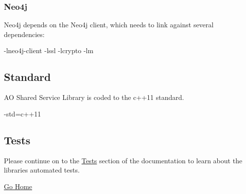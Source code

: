 \subsubsection*{Neo4j}

Neo4j depends on the Neo4j client, which needs to link against several dependencies\+: \begin{DoxyVerb}-lneo4j-client -lssl -lcrypto -lm
\end{DoxyVerb}


\subsection*{Standard}

AO Shared Service Library is coded to the c++11 standard. \begin{DoxyVerb}-std=c++11
\end{DoxyVerb}


\subsection*{Tests}

Please continue on to the \hyperlink{tests}{Tests} section of the documentation to learn about the libraries automated tests.

\hyperlink{index}{Go Home} 